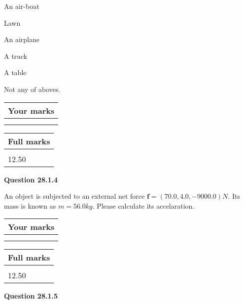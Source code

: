 \documentclass[12pt]{article}
\begin{document}
  
 
 
An air-boat
 
 
Lawn
 
 
An airplane
 
 
A truck
 
 
A table
 
 
  Not any of aboves.
 
 
 
\vspace{0.3in}
  
\vspace{0.2in}
  
         \begin{tabular}{|l|}
\hline
 Your marks  \\
\hline
 \\ 
 \\ 
\hline
\end{tabular}
\hspace{0.05in} \begin{tabular}{|l|}
\hline
 Full marks  \\
\hline
 \\ 
12.50 \\
\hline
\end{tabular}
{\textbf{\Large{Question
28.1.4 
}}}
  
  
 
An object is subjected to an external net force $\mathbf{f}=(
70.0,  %
4.0,
-9000.0  )N$. Its mass is known as
$m= %
56.0 kg$. Please calculate its accelaration.
 
 

 

 
\vspace{0.3in}
  
\vspace{0.2in}
  
         \begin{tabular}{|l|}
\hline
 Your marks  \\
\hline
 \\ 
 \\ 
\hline
\end{tabular}
\hspace{0.05in} \begin{tabular}{|l|}
\hline
 Full marks  \\
\hline
 \\ 
12.50 \\
\hline
\end{tabular}
{\textbf{\Large{Question
28.1.5 
}}}
  
\end{document}
